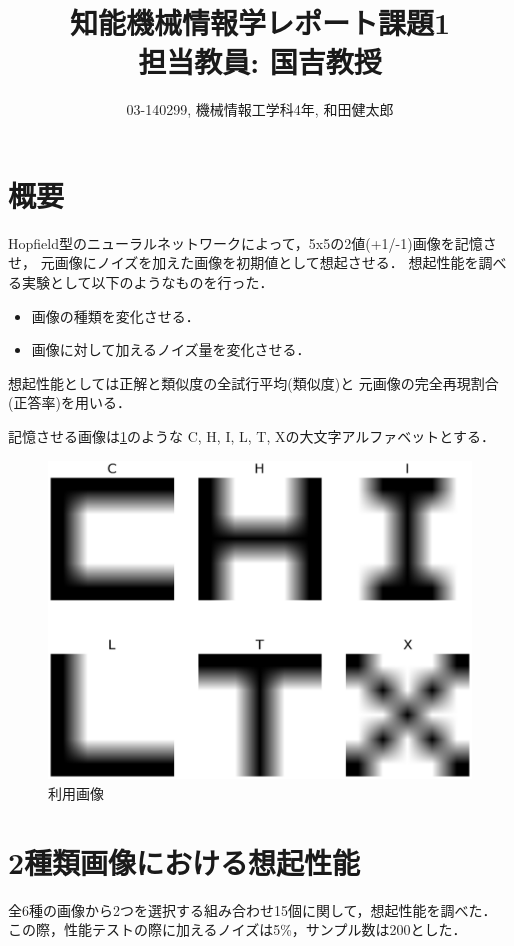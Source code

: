 \documentclass[10pt,twocolumn]{jarticle}
\title{知能機械情報学レポート課題1 \\ \large{担当教員: 国吉教授}}
\author{03-140299, 機械情報工学科4年, 和田健太郎}
\newcommand{\figref}[1]{\figurename\ref{fig:#1}}
\begin{document}
\maketitle


\section{概要}
Hopfield型のニューラルネットワーク\cite{Kuniyoshi:20150601}\cite{Youtube:HF}によって，5x5の2値(+1/-1)画像を記憶させ，
元画像にノイズを加えた画像を初期値として想起させる．
想起性能を調べる実験として以下のようなものを行った．
\begin{itemize}
  \item 画像の種類を変化させる．
  \item 画像に対して加えるノイズ量を変化させる．
\end{itemize}

想起性能としては正解と類似度の全試行平均(類似度)と
元画像の完全再現割合(正答率)を用いる．

記憶させる画像は\figref{original-images}のような
C, H, I, L, T, Xの大文字アルファベットとする．
\begin{figure}[htbp]
  \centering
    \includegraphics[width=\columnwidth]{figs/alphabet_images}
    \caption{利用画像}
  \label{fig:original-images}
\end{figure}


\section{2種類画像における想起性能}\label{sec:two-label-performance}
全6種の画像から2つを選択する組み合わせ15個に関して，想起性能を調べた．
この際，性能テストの際に加えるノイズは5\%，サンプル数は200とした．
\end{document}
